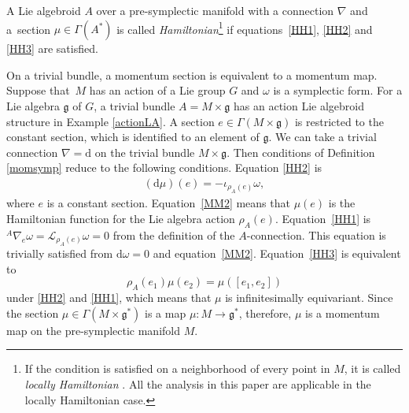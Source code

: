 \documentclass[pdftex]{sigma}
\numberwithin{equation}{section}
\newcommand{\calL}{{\mathcal L}}
\newcommand{\rhoa}{{\rho_A}}
\newcommand{\rd}{\mathrm{d}}
\newcommand{\anabla}{{{}^A \nabla}}
\begin{document}
\begin{Definition}\label{HamiltonianLAS}
A Lie algebroid $A$ over a pre-symplectic manifold with a connection $\nabla$ and a~section $\mu \in \Gamma(A^*)$ is called \textit{Hamiltonian}\footnote{If the condition is satisfied on a neighborhood of every point in $M$, it is called \textit{locally Hamiltonian} \cite{Blohmann:2018}. All the analysis in this paper are applicable in the locally Hamiltonian case.}
if equations~\eqref{HH1}, \eqref{HH2} and \eqref{HH3}
are satisfied.
\end{Definition}
On a trivial bundle, a momentum section is equivalent to a momentum map.
Suppose that~$M$ has an action of a Lie group $G$
and $\omega$ is a symplectic form.
For a Lie algebra $\mathfrak{g}$ of $G$, a trivial bundle
$A = M \times \mathfrak{g}$ has an action Lie algebroid structure
in Example \ref{actionLA}.
A section $e \in \Gamma(M \times \mathfrak{g})$ is
restricted to the constant section, which is identified
to an element of $\mathfrak{g}$.
We can take a trivial connection $\nabla=\rd$ on the trivial bundle
$M \times \mathfrak{g}$.
Then conditions of Definition \ref{momsymp} reduce
to the following conditions.
Equation \eqref{HH2} is
\begin{gather}
(\rd \mu)(e) = - \iota_{\rhoa(e)} \omega,
\label{MM2}
\end{gather}
where $e$ is a constant section.
Equation~\eqref{MM2} means that $\mu(e)$ is the Hamiltonian function for the Lie algebra action $\rhoa(e)$.
Equation~\eqref{HH1} is
$\anabla_e \omega = \calL_{\rhoa(e)} \omega = 0$ from the definition of
the $A$-connection.
This equation is trivially satisfied from $\rd \omega =0$ and equation~\eqref{MM2}.
Equation~\eqref{HH3} is equivalent to
\[%
\rhoa(e_1) \mu(e_2) = \mu([e_1, e_2])
\]
under \eqref{HH2} and \eqref{HH1}, which means that $\mu$ is infinitesimally
equivariant.
Since the section $\mu \in \Gamma(M \times \mathfrak{g}^*)$ is a map
$\mu\colon M \rightarrow \mathfrak{g}^*$,
therefore, $\mu$ is a momentum map on the pre-symplectic manifold $M$.
\end{document}
